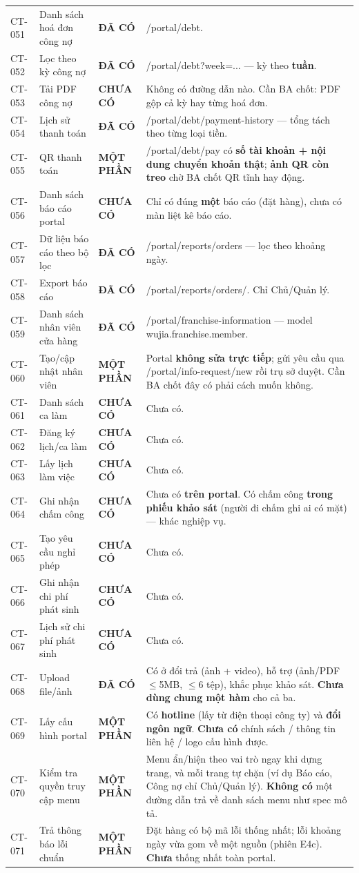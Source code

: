 \documentclass[11pt,a4paper]{report}
\newcommand{\ok}{\textcolor{okc}{\textbf{ĐÃ CÓ}}}
\newcommand{\pt}{\textcolor{partc}{\textbf{MỘT PHẦN}}}
\newcommand{\no}{\textcolor{noc}{\textbf{CHƯA CÓ}}}
\newcommand{\rt}[1]{{\ttfamily\footnotesize #1}}
\begin{document}
{\begin{longtable}{@{}L{1.2cm}L{4.2cm}L{1.9cm}L{7.6cm}@{}}
CT-051 & Danh sách hoá đơn công nợ & \ok & \rt{/portal/debt}. \\
CT-052 & Lọc theo kỳ công nợ & \ok & \rt{/portal/debt?week=...} — kỳ theo \textbf{tuần}. \\
CT-053 & Tải PDF công nợ & \no & Không có đường dẫn nào. Cần BA chốt: PDF gộp cả kỳ hay từng hoá đơn. \\
CT-054 & Lịch sử thanh toán & \ok & \rt{/portal/debt/payment-history} — tổng tách theo từng loại tiền. \\
CT-055 & QR thanh toán & \pt & \rt{/portal/debt/pay} có \textbf{số tài khoản + nội dung chuyển khoản thật}; \textbf{ảnh QR còn treo} chờ BA chốt QR tĩnh hay động. \\
CT-056 & Danh sách báo cáo portal & \no & Chỉ có đúng \textbf{một} báo cáo (đặt hàng), chưa có màn liệt kê báo cáo. \\
CT-057 & Dữ liệu báo cáo theo bộ lọc & \ok & \rt{/portal/reports/orders} — lọc theo khoảng ngày. \\
CT-058 & Export báo cáo & \ok & \rt{/portal/reports/orders/}\allowbreak\rt{export.xlsx}. Chỉ Chủ/Quản lý. \\
CT-059 & Danh sách nhân viên cửa hàng & \ok & \rt{/portal/franchise-information} — model \rt{wujia.franchise.member}. \\
CT-060 & Tạo/cập nhật nhân viên & \pt & Portal \textbf{không sửa trực tiếp}; gửi yêu cầu qua \rt{/portal/info-request/new} rồi trụ sở duyệt. Cần BA chốt đây có phải cách muốn không. \\
CT-061 & Danh sách ca làm & \no & Chưa có. \\
CT-062 & Đăng ký lịch/ca làm & \no & Chưa có. \\
CT-063 & Lấy lịch làm việc & \no & Chưa có. \\
CT-064 & Ghi nhận chấm công & \no & Chưa có \textbf{trên portal}. Có chấm công \textbf{trong phiếu khảo sát} (người đi chấm ghi ai có mặt) — khác nghiệp vụ. \\
CT-065 & Tạo yêu cầu nghỉ phép & \no & Chưa có. \\
CT-066 & Ghi nhận chi phí phát sinh & \no & Chưa có. \\
CT-067 & Lịch sử chi phí phát sinh & \no & Chưa có. \\
CT-068 & Upload file/ảnh & \ok & Có ở đổi trả (ảnh + video), hỗ trợ (ảnh/PDF $\leq$5MB, $\leq$6 tệp), khắc phục khảo sát. \textbf{Chưa dùng chung một hàm} cho cả ba. \\
CT-069 & Lấy cấu hình portal & \pt & Có \textbf{hotline} (lấy từ điện thoại công ty) và \textbf{đổi ngôn ngữ}. \textbf{Chưa có} chính sách / thông tin liên hệ / logo cấu hình được. \\
CT-070 & Kiểm tra quyền truy cập menu & \pt & Menu ẩn/hiện theo vai trò ngay khi dựng trang, và mỗi trang tự chặn (ví dụ Báo cáo, Công nợ chỉ Chủ/Quản lý). \textbf{Không có} một đường dẫn trả về danh sách menu như spec mô tả. \\
CT-071 & Trả thông báo lỗi chuẩn & \pt & Đặt hàng có bộ mã lỗi thống nhất; lỗi khoảng ngày vừa gom về một nguồn (phiên E4c). \textbf{Chưa} thống nhất toàn portal. \\
\bottomrule
\end{longtable}}
\end{document}
